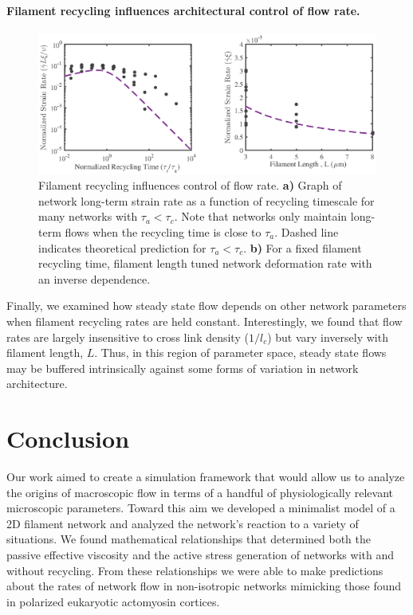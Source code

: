 \documentclass[10pt,letterpaper]{article}
\begin{document}
\paragraph{Filament recycling influences architectural control of flow rate.}

\begin{figure}[h!]
	\centering
	\includegraphics[width=\hsize]{figures/figure10}
	\caption{\label{fig:flow_form}  Filament recycling influences control of flow rate. \textbf{a)} Graph of network long-term strain rate as a function of recycling timescale for many networks with $\tau_a<\tau_c$.  Note that networks only maintain long-term flows when the recycling time is close to $\tau_a$. Dashed line indicates theoretical prediction for $\tau_a<\tau_c$. \textbf{b)}  For a fixed filament recycling time, filament length tuned network deformation rate with an inverse dependence. }
\end{figure}

Finally, we examined how steady state flow depends on other network parameters when filament recycling rates are held constant.   Interestingly, we found that flow rates are largely insensitive to cross link density ($1/l_c$) but vary inversely with filament length, $L$. Thus, in this region of parameter space, steady state flows may be buffered intrinsically against some forms of variation in network architecture.










\section*{Conclusion}
Our work aimed to create a simulation framework that would allow us to analyze the origins of macroscopic flow in terms of a handful of physiologically relevant microscopic parameters.  Toward this aim we developed a minimalist model of a 2D filament network and analyzed the network's reaction to a variety of situations.  We found mathematical relationships that determined both the passive effective viscosity and the active stress generation of networks with and without recycling.  From these relationships we were able to make predictions about the rates of network flow in non-isotropic networks mimicking those found in polarized eukaryotic actomyosin cortices.  
\end{document}
